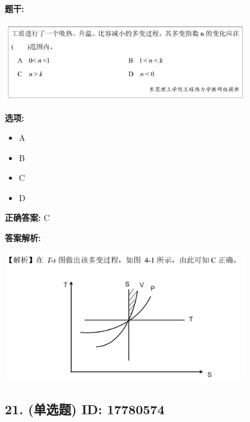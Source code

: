 \documentclass[12pt]{article}
\begin{document}
\textbf{题干:}


\begin{center}\includegraphics[width=0.8\textwidth, height=0.25\textheight, keepaspectratio]{question_20_17780604/title_img_1.png}\end{center}

\textbf{选项:}
\begin{itemize}[leftmargin=*]
  \item A

  \item B

  \item C

  \item D

\end{itemize}

\textbf{正确答案:}
C

\textbf{答案解析:}


\begin{center}\includegraphics[width=0.8\textwidth, height=0.25\textheight, keepaspectratio]{question_20_17780604/correct_replay_img_1.png}\end{center}

\vspace{0.5em}\hrulefill\vspace{1em}

\subsection*{21. (单选题) \small ID: 17780574}
\end{document}
